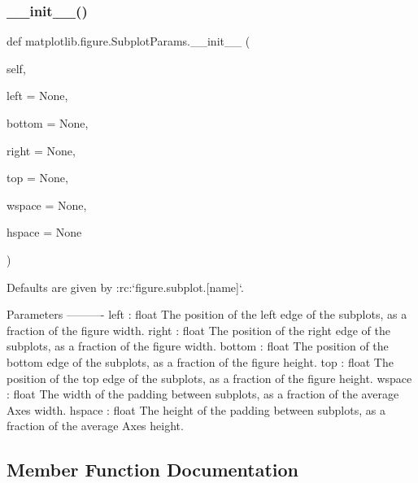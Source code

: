 \subsubsection{\texorpdfstring{\+\_\+\+\_\+init\+\_\+\+\_\+()}{\_\_init\_\_()}}
{\footnotesize\ttfamily def matplotlib.\+figure.\+Subplot\+Params.\+\_\+\+\_\+init\+\_\+\+\_\+ (\begin{DoxyParamCaption}\item[{}]{self,  }\item[{}]{left = {\ttfamily None},  }\item[{}]{bottom = {\ttfamily None},  }\item[{}]{right = {\ttfamily None},  }\item[{}]{top = {\ttfamily None},  }\item[{}]{wspace = {\ttfamily None},  }\item[{}]{hspace = {\ttfamily None} }\end{DoxyParamCaption})}

\begin{DoxyVerb}Defaults are given by :rc:`figure.subplot.[name]`.

Parameters
----------
left : float
    The position of the left edge of the subplots,
    as a fraction of the figure width.
right : float
    The position of the right edge of the subplots,
    as a fraction of the figure width.
bottom : float
    The position of the bottom edge of the subplots,
    as a fraction of the figure height.
top : float
    The position of the top edge of the subplots,
    as a fraction of the figure height.
wspace : float
    The width of the padding between subplots,
    as a fraction of the average Axes width.
hspace : float
    The height of the padding between subplots,
    as a fraction of the average Axes height.
\end{DoxyVerb}
 

\subsection{Member Function Documentation}
\mbox{\label{classmatplotlib_1_1figure_1_1SubplotParams_a5a0bdf15e19379636953494c90a81030}} 
